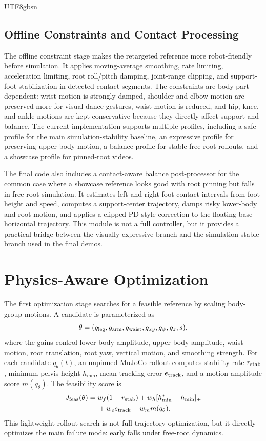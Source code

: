 \documentclass[conference]{IEEEtran}
\begin{document}
\begin{CJK*}{UTF8}{gbsn}
\subsection{Offline Constraints and Contact Processing}
The offline constraint stage makes the retargeted reference more robot-friendly before simulation. It applies moving-average smoothing, rate limiting, acceleration limiting, root roll/pitch damping, joint-range clipping, and support-foot stabilization in detected contact segments. The constraints are body-part dependent: wrist motion is strongly damped, shoulder and elbow motion are preserved more for visual dance gestures, waist motion is reduced, and hip, knee, and ankle motions are kept conservative because they directly affect support and balance. The current implementation supports multiple profiles, including a safe profile for the main simulation-stability baseline, an expressive profile for preserving upper-body motion, a balance profile for stable free-root rollouts, and a showcase profile for pinned-root videos.

The final code also includes a contact-aware balance post-processor for the common case where a showcase reference looks good with root pinning but falls in free-root simulation. It estimates left and right foot contact intervals from foot height and speed, computes a support-center trajectory, damps risky lower-body and root motion, and applies a clipped PD-style correction to the floating-base horizontal trajectory. This module is not a full controller, but it provides a practical bridge between the visually expressive branch and the simulation-stable branch used in the final demos.

\section{Physics-Aware Optimization}
The first optimization stage searches for a feasible reference by scaling body-group motions. A candidate is parameterized as
\begin{equation}
\theta=(g_{\rm leg},g_{\rm arm},g_{\rm waist},g_{xy},g_{\psi},g_z,s),
\end{equation}
where the gains control lower-body amplitude, upper-body amplitude, waist motion, root translation, root yaw, vertical motion, and smoothing strength. For each candidate $q_\theta(t)$, an unpinned MuJoCo rollout computes stability rate $r_{\rm stab}$, minimum pelvis height $h_{\min}$, mean tracking error $e_{\rm track}$, and a motion amplitude score $m(q_\theta)$. The feasibility score is
\begin{align}
J_{\rm feas}(\theta)={}&w_f(1-r_{\rm stab})+w_h[h^*_{\min}-h_{\min}]_+ \nonumber\\
&+w_e e_{\rm track}-w_m m(q_\theta).
\end{align}
This lightweight rollout search is not full trajectory optimization, but it directly optimizes the main failure mode: early falls under free-root dynamics.


\end{CJK*}
\end{document}

